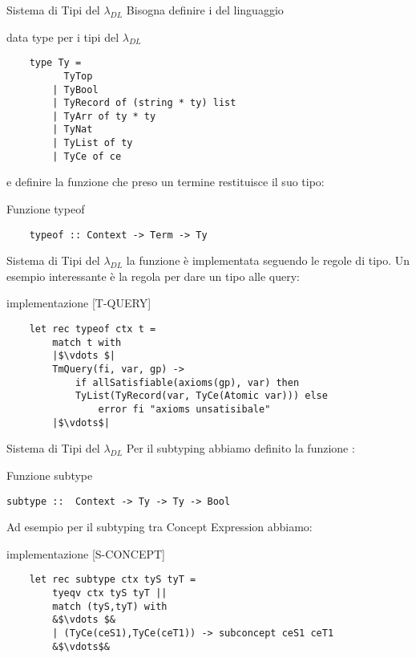 \begin{frame}[containsverbatim]{Sistema di Tipi del $\lambda_{DL}$}
Bisogna definire i  del linguaggio
    \begin{block}{data type per i tipi del $\lambda_{DL}$}
    \begin{verbatim}
    type Ty =
          TyTop 
        | TyBool 
        | TyRecord of (string * ty) list 
        | TyArr of ty * ty 
        | TyNat 
        | TyList of ty
        | TyCe of ce
    \end{verbatim}
    \end{block}
    e definire la funzione che preso un termine restituisce il suo tipo:
    \begin{block}{Funzione typeof}
    \begin{verbatim}
    typeof :: Context -> Term -> Ty
    \end{verbatim}
    \end{block}
\end{frame}

\begin{frame}[containsverbatim]{Sistema di Tipi del $\lambda_{DL}$}
la funzione  \`e implementata seguendo le regole di tipo. Un esempio interessante \`e la regola per dare un tipo alle query:
~\\
\begin{block}{implementazione [T-QUERY]}
\begin{verbatim}
    let rec typeof ctx t =
        match t with
        |$\vdots $|
        TmQuery(fi, var, gp) ->
            if allSatisfiable(axioms(gp), var) then
            TyList(TyRecord(var, TyCe(Atomic var))) else
                error fi "axioms unsatisibale"
        |$\vdots$|
\end{verbatim}
\end{block}
\end{frame}

\begin{frame}[containsverbatim]{Sistema di Tipi del $\lambda_{DL}$}
Per il subtyping abbiamo definito la funzione :
\begin{block}{Funzione subtype}
\begin{verbatim}
subtype ::  Context -> Ty -> Ty -> Bool
\end{verbatim}
\end{block}
Ad esempio per il subtyping tra Concept Expression abbiamo:  
\begin{block}{implementazione [S-CONCEPT]}
\begin{verbatim}
    let rec subtype ctx tyS tyT =
        tyeqv ctx tyS tyT ||
        match (tyS,tyT) with
        &$\vdots $&
        | (TyCe(ceS1),TyCe(ceT1)) -> subconcept ceS1 ceT1
        &$\vdots$&
\end{verbatim}
\end{block}
\end{frame}

